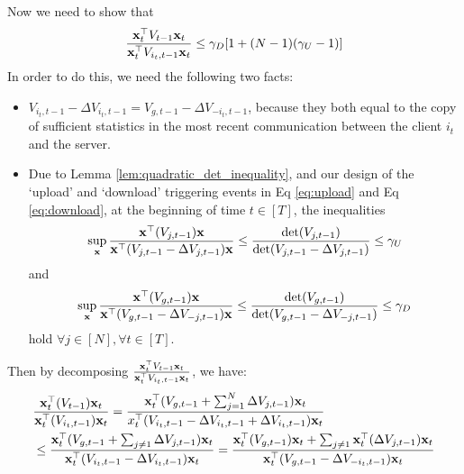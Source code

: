 Now we need to show that $$\frac{\mathbf{x}_{t}^{\top}{V}_{t-1}\mathbf{x}_{t}}{\mathbf{x}_{t}^{\top}{V}_{i_{t},t-1}\mathbf{x}_{t}} \leq \gamma_{D} [1+(N-1)(\gamma_{U}-1)]$$
In order to do this, we need the following two facts: 
\begin{itemize}
    \item $V_{i_{t},t-1}-\Delta{V}_{i_{t},t-1}=V_{g,t-1}-\Delta{V}_{-i_{t},t-1}$, because they both equal to the copy of sufficient statistics in the most recent communication between the client $i_{t}$ and the server.
    \item Due to Lemma \ref{lem:quadratic_det_inequality}, and our design of the `upload' and `download' triggering events in Eq \eqref{eq:upload} and Eq \eqref{eq:download}, at the beginning of time $t\in[T]$, the inequalities
\small
\begin{equation} \label{eq:upload_inequailty}
    \sup_{\mathbf{x}}\frac{\mathbf{x}^{\top}({V}_{j,t-1})\mathbf{x}}{\mathbf{x}^{\top} (V_{j,t-1}-\Delta{V}_{j,t-1}) \mathbf{x}} \leq \frac{\det({V}_{j,t-1})}{\det(V_{j,t-1}-\Delta{V}_{j,t-1})} \leq \gamma_{U}
\end{equation}
\normalsize
and  
\small
\begin{equation}\label{eq:download_inequailty}
    \sup_{\mathbf{x}}\frac{\mathbf{x}^{\top}({V}_{g,t-1})\mathbf{x}}{\mathbf{x}^{\top} (V_{g,t-1}-\Delta{V}_{-j,t-1}) \mathbf{x}} \leq \frac{\det({V}_{g,t-1})}{\det(V_{g,t-1}-\Delta{V}_{-j,t-1})} \leq \gamma_{D}
\end{equation}
\normalsize
hold $\forall j \in [N], \forall t\in [T]$.
\end{itemize}
Then by decomposing $\frac{\mathbf{x}_{t}^{\top}V_{t-1}\mathbf{x}_{t}}{\mathbf{x}_{t}^{\top}V_{i_{t},t-1}\mathbf{x}_{t}}$, we have:
\begin{equation*}
\begin{split}
& \frac{\mathbf{x}_{t}^{\top}(V_{t-1})\mathbf{x}_{t}}{\mathbf{x}_{t}^{\top}(V_{i_{t},t-1})\mathbf{x}_{t}} = \frac{\mathbf{x}_{t}^{\top}(V_{g,t-1}+\sum_{j=1}^{N}\Delta{V}_{j,t-1})\mathbf{x}_{t}}{x_{t}^{\top}(V_{i_{t},t-1}-\Delta{V}_{i_{t},t-1}+\Delta{V}_{i_{t},t-1})\mathbf{x}_{t}} \\
& \leq \frac{\mathbf{x}_{t}^{\top}(V_{g,t-1}+\sum_{j\neq 1}\Delta{V}_{j,t-1})\mathbf{x}_{t}}{\mathbf{x}_{t}^{\top}(V_{i_{t},t-1}-\Delta{V}_{i_{t},t-1})\mathbf{x}_{t}} = \frac{\mathbf{x}_{t}^{\top}(V_{g,t-1})\mathbf{x}_{t} +\sum_{j\neq 1} \mathbf{x}_{t}^{\top}(\Delta{V}_{j,t-1})\mathbf{x}_{t}}{\mathbf{x}_{t}^{\top}(V_{g,t-1}-\Delta{V}_{-i_{t},t-1})\mathbf{x}_{t}} \\
\end{split}
\end{equation*}
